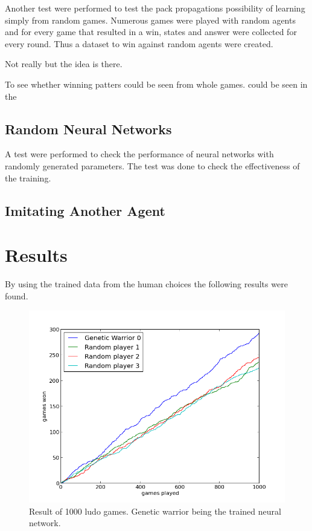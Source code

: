 \documentclass{llncs}
\begin{document}
Another test were performed to test the pack propagations possibility of learning simply from random games. Numerous games were played with random agents and for every game that resulted in a win, states and answer were collected for every round. Thus a dataset to win against random agents were created. 

Not really but the idea is there.

To see whether winning patters could be seen from whole games.  could be seen in the 

 
\subsection*{Random Neural Networks}

A test were performed to check the performance of neural networks with randomly generated parameters. The test was done to check the effectiveness of the training.



\subsection*{Imitating Another Agent}




\section*{Results} %


By using the trained data from the human choices the following results were found.




\begin{figure}[t]
        \centering
		\includegraphics[scale=0.3]{../lillens_gener_unscaled_u.png} 
        \caption{ Result of 1000 ludo games. Genetic warrior being the trained neural network.}\label{fig:ligener}
\end{figure} 
\end{document}
